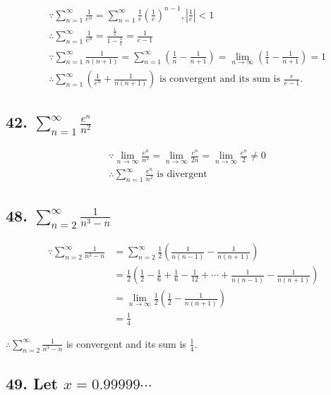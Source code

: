 \documentclass{article}
\begin{document}
    $$\begin{aligned}
        & \because \sum_{n=1}^\infty \frac{1}{e^n} = \sum_{n=1}^\infty \frac 1 e (\frac 1 e)^{n-1}, |\frac 1 e| < 1 \\
        & \therefore \sum_{n=1}^\infty \frac{1}{e^n} = \frac{\frac 1 e}{1 - \frac 1 e} = \frac{1}{e - 1} \\
        & \because \sum_{n=1}^\infty \frac{1}{n(n+1)} = \sum_{n=1}^\infty (\frac 1 n - \frac{1}{n+1}) = \lim_{n\to\infty} (\frac 1 1 - \frac{1}{n+1}) = 1 \\
        & \therefore \sum_{n=1}^\infty (\frac{1}{e^n} + \frac{1}{n(n+1)}) \textrm{ is convergent and its sum is } \frac{e}{e-1}.
    \end{aligned}$$

    \subsection*{42. $\sum_{n=1}^\infty\frac{e^n}{n^2}$}

    $$\begin{aligned}
        & \because \lim_{n\to\infty}\frac{e^n}{n^2} = \lim_{n\to\infty}\frac{e^n}{2n} = \lim_{n\to\infty}\frac{e^n}{2} \not = 0 \\
        & \therefore \sum_{n=1}^\infty\frac{e^n}{n^2} \textrm{ is divergent}
    \end{aligned}$$

    \subsection*{48. $\sum_{n=2}^\infty \frac{1}{n^3 - n}$}

    $$\begin{aligned}
        \because \sum_{n=2}^\infty \frac{1}{n^3 - n} &= \sum_{n=2}^\infty \frac 1 2(\frac{1}{n(n-1)} - \frac{1}{n(n+1)}) \\
        &= \frac 1 2(\frac{1}{2} - \frac{1}{6} + \frac{1}{6} - \frac{1}{12} + \cdots + \frac{1}{n(n-1)} - \frac{1}{n(n+1)}) \\
        &= \lim_{n\to\infty} \frac 1 2(\frac 1 2 - \frac{1}{n(n+1)}) \\
        &= \frac 1 4
    \end{aligned}$$

    $\therefore\sum_{n=2}^\infty \frac{1}{n^3 - n}$ is convergent and its sum is $\frac 1 4$.

    \subsection*{49. Let $x=0.99999 \cdots$}
\end{document}
